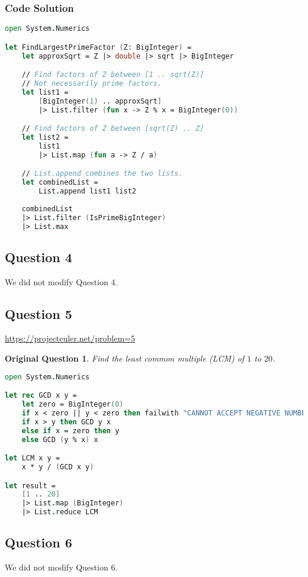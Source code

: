 \documentclass[12pt]{article}
\newtheorem*{origQuestion*}{Original Question}
\begin{document}
\subsubsection*{Code Solution}
\begin{lstlisting}[language=FSharp]
open System.Numerics

let FindLargestPrimeFactor (Z: BigInteger) =
    let approxSqrt = Z |> double |> sqrt |> BigInteger

    // Find factors of Z between [1 .. sqrt(Z)]
    // Not necessarily prime factors.
    let list1 =
        [BigInteger(1) .. approxSqrt]
        |> List.filter (fun x -> Z % x = BigInteger(0))

    // Find factors of Z between [sqrt(Z) .. Z]
    let list2 =
        list1
        |> List.map (fun a -> Z / a)

    // List.append combines the two lists.
    let combinedList =
        List.append list1 list2
        
    combinedList
    |> List.filter (IsPrimeBigInteger)
    |> List.max
\end{lstlisting}
\subsection*{Question 4} 
We did not modify Question 4.

\pagebreak
\subsection*{Question 5} 
\url{https://projecteuler.net/problem=5}
\begin{origQuestion*}
Find the least common multiple (LCM) of $1$ to $20$.
\end{origQuestion*}
\begin{lstlisting}[language=FSharp]
open System.Numerics

let rec GCD x y =
    let zero = BigInteger(0)
    if x < zero || y < zero then failwith "CANNOT ACCEPT NEGATIVE NUMBERS"
    if x > y then GCD y x
    else if x = zero then y
    else GCD (y % x) x

let LCM x y = 
    x * y / (GCD x y)

let result =
    [1 .. 20]
    |> List.map (BigInteger)
    |> List.reduce LCM
\end{lstlisting}
\subsection*{Question 6} 
We did not modify Question 6.
\end{document}
